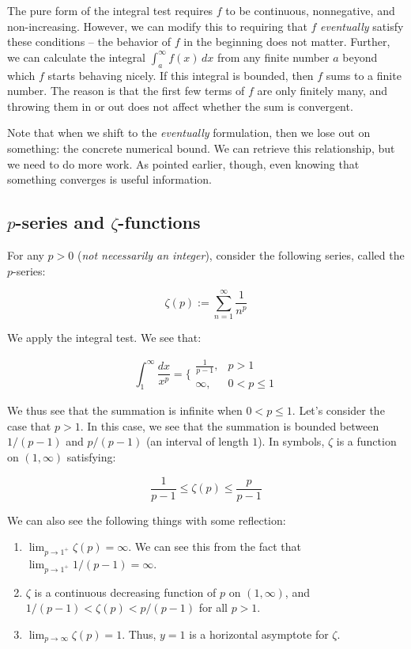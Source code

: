 \documentclass{amsart}
\begin{document}
The pure form of the integral test requires $f$ to be continuous,
nonnegative, and non-increasing. However, we can modify this to
requiring that $f$ {\em eventually} satisfy these conditions -- the
behavior of $f$ in the beginning does not matter. Further, we can
calculate the integral $\int_a^\infty f(x) \, dx$ from any finite
number $a$ beyond which $f$ starts behaving nicely. If this integral
is bounded, then $f$ sums to a finite number. The reason is that the
first few terms of $f$ are only finitely many, and throwing them in or
out does not affect whether the sum is convergent.

Note that when we shift to the {\em eventually} formulation, then we
lose out on something: the concrete numerical bound. We can retrieve
this relationship, but we need to do more work. As pointed earlier,
though, even knowing that something converges is useful information.

\subsection{$p$-series and $\zeta$-functions}

For any $p > 0$ ({\em not necessarily an integer}), consider the
following series, called the $p$-series:

$$\zeta(p) := \sum_{n=1}^\infty \frac{1}{n^p}$$

We apply the integral test. We see that:

$$\int_1^\infty \frac{dx}{x^p} = \lbrace\begin{array}{ll}\frac{1}{p - 1}, & p > 1\\ \infty, & 0 < p \le 1\end{array}$$

We thus see that the summation is infinite when $0 < p \le 1$. Let's
consider the case that $p > 1$. In this case, we see that the
summation is bounded between $1/(p-1)$ and $p/(p-1)$ (an interval of
length $1$). In symbols, $\zeta$ is a function on $(1,\infty)$
satisfying:

$$\frac{1}{p-1} \le \zeta(p) \le \frac{p}{p-1}$$

We can also see the following things with some reflection:

\begin{enumerate}
\item $\lim_{p \to 1^+} \zeta(p) = \infty$. We can see this from the
  fact that $\lim_{p \to 1^+} 1/(p-1) = \infty$.
\item $\zeta$ is a continuous decreasing function of $p$ on
  $(1,\infty)$, and $1/(p-1) < \zeta(p) < p/(p-1)$ for all $p > 1$.
\item $\lim_{p \to \infty} \zeta(p) = 1$. Thus, $y = 1$ is a
  horizontal asymptote for $\zeta$.
\end{enumerate}
\end{document}
